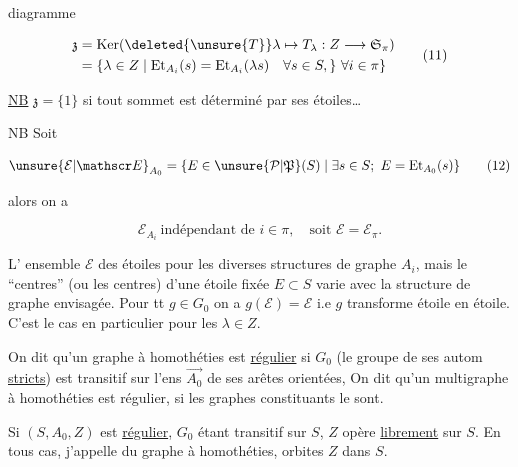 diagramme


\[
\begin{aligned}
\mathfrak z&=\operatorname{Ker}(\deleted{\unsure{T}}\lambda\mapsto T_\lambda:Z\longrightarrow\mathfrak S_\pi)\\
&=\{\lambda\in Z\mid\mathrm{Et}_{A_i}(s)=\mathrm{Et}_{A_i}(\lambda s)\quad\forall s\in S,\}\ \forall i\in\pi\rbrace
\end{aligned}\tag*{(11)}
\]

\uline{NB} $\mathfrak z=\{1\}$ si tout sommet est déterminé par ses étoiles\ldots

NB Soit 

\[ \unsure{\mathcal E|\mathscr E}_{A_0}=\{E\in\unsure{\mathcal P|\mathfrak P}(S)\mid\exists s\in S;\ E=\mathrm{Et}_{A_0}(s)\} \tag*{(12)} \]

alors on a

\[ \mathcal E_{A_i}\ \text{indépendant de }i\in\pi,\quad\text{soit }\mathcal E=\mathcal E_\pi. \tag*{(13)} \]

L'  ensemble $\mathcal E$  des étoiles pour les diverses structures de graphe $A_i$, mais le  ``centres''  (ou les centres) d'une étoile fixée $E\subset S$ varie\unsure{(nt]|(nt)} avec la structure de graphe envisagée. Pour tt $g\in G_0$ on a $g(\mathcal E)=\mathcal E$ i.e $g$ transforme étoile en étoile. C'est le cas en particulier pour les  $\lambda\in Z$.


On dit qu'un graphe à homothéties est \uline{régulier} si $G_0$ (le groupe de ses autom \uline{stricts}) est transitif sur l'ens $\overrightarrow{A_0}$ de ses arêtes orientées,  On dit qu'un multigraphe  à homothéties est régulier, si les graphes constituants le sont.

Si  $(S,A_0,Z)$ est  \uline{régulier}, $G_0$ étant transitif sur $S$, $Z$ opère \uline{librement} sur $S$. En tous cas, j'appelle \uline{} du graphe à homothéties,  orbites   $Z$ dans $S$.


